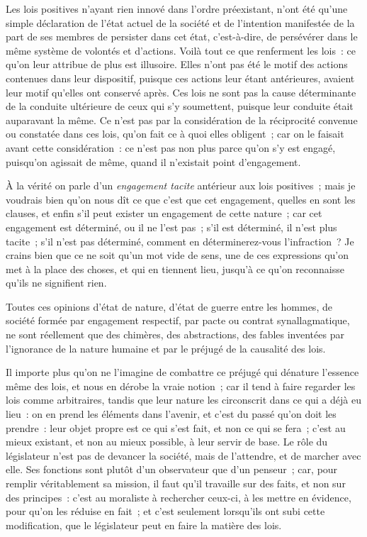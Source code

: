 \documentclass[french,twoside]{book} %
\begin{document}
Les lois positives n’ayant rien innové dans l’ordre préexistant, n’ont été qu’une simple déclaration de l’état actuel de la société et de l’intention manifestée de la part de ses membres de persister dans cet état, c’est-à-dire, de persévérer dans le même système de volontés et d’actions. Voilà tout ce que renferment les lois : ce qu’on leur attribue de plus est illusoire. Elles n’ont pas été le motif des actions contenues dans leur dispositif, puisque ces actions leur étant antérieures, avaient leur motif qu’elles ont conservé après. Ces lois ne sont pas la cause déterminante de la conduite ultérieure de ceux qui s’y soumettent, puisque leur conduite était auparavant la même. Ce n’est pas par la considération de la réciprocité convenue ou constatée dans ces lois, qu’on fait ce à quoi elles obligent ; car on le faisait avant cette considération : ce n’est pas non plus parce qu’on s’y est engagé, puisqu’on agissait de même, quand il n’existait point d’engagement.\par
À la vérité on parle d’un {\itshape engagement tacite} antérieur aux lois positives ; mais je voudrais bien qu’on nous dît ce que c’est que cet engagement, quelles en sont les clauses, et enfin s’il peut exister un engagement de cette nature ; car cet engagement est déterminé, ou il ne l’est pas ; s’il est déterminé, il n’est plus tacite ; s’il n’est pas déterminé, comment en déterminerez-vous l’infraction ? Je crains bien que ce ne soit qu’un mot vide de sens, une de ces expressions qu’on met à la place des choses, et qui en tiennent lieu, jusqu’à ce qu’on reconnaisse qu’ils ne signifient rien.\par
Toutes ces opinions d’état de nature, d’état de guerre entre les hommes, de société formée par engagement respectif, par pacte ou contrat synallagmatique, ne sont réellement que des chimères, des abstractions, des fables inventées par l’ignorance de la nature humaine et par le préjugé de la causalité des lois.\par
Il importe plus qu’on ne l’imagine de combattre ce préjugé qui dénature l’essence même des lois, et nous en dérobe la vraie notion ; car il tend à faire regarder les lois comme arbitraires, tandis que leur nature les circonscrit dans ce qui a déjà eu lieu : on en prend les éléments dans l’avenir, et c’est du passé qu’on doit les prendre : leur objet propre est ce qui s’est fait, et non ce qui se fera ; c’est au mieux existant, et non au mieux possible, à leur servir de base. Le rôle du législateur n’est pas de devancer la société, mais de l’attendre, et de marcher avec elle. Ses fonctions sont plutôt d’un observateur que d’un penseur ; car, pour remplir véritablement sa mission, il faut qu’il travaille sur des faits, et non sur des principes : c’est au moraliste à rechercher ceux-ci, à les mettre en évidence, pour qu’on les réduise en fait ; et c’est seulement lorsqu’ils ont subi cette modification, que le législateur peut en faire la matière des lois.\par
\end{document}
